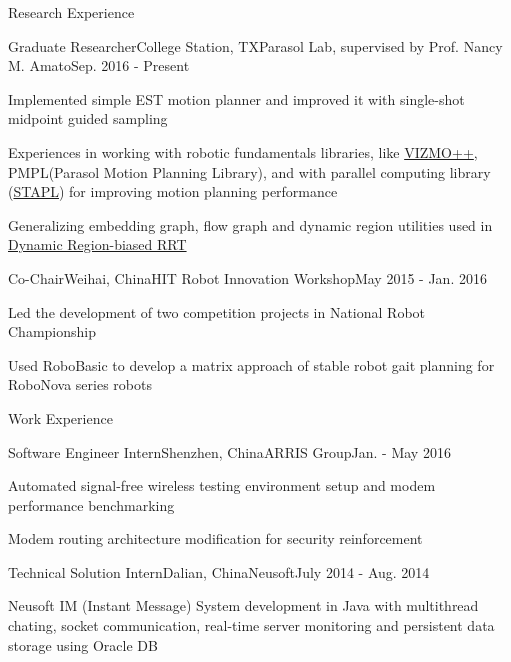 \documentclass{resume} %
\begin{document}

\begin{rSection}{Research Experience}
\begin{rSubsection}{Graduate Researcher}{College Station, TX}{Parasol Lab, supervised by Prof. Nancy M. Amato}{Sep. 2016 - Present}
\item Implemented simple EST motion planner and improved it with single-shot midpoint guided sampling
\item Experiences in working with robotic fundamentals libraries, like \href{https://parasol.tamu.edu/groups/amatogroup/research/UserGuided/Old/vizmo++/}{VIZMO++}, PMPL(Parasol Motion Planning Library), and with parallel computing library (\href{https://parasol.tamu.edu/groups/rwergergroup/research/stapl/}{STAPL}) for improving motion planning performance
\item Generalizing embedding graph, flow graph and dynamic region utilities used in \href{http://wafr2016.berkeley.edu/papers/WAFR_2016_paper_36.pdf}{Dynamic Region-biased RRT}
\end{rSubsection}

\begin{rSubsection}{Co-Chair}{Weihai, China}{HIT Robot Innovation Workshop}{May 2015 - Jan. 2016}
\item Led the development of two competition projects in National Robot Championship
\item Used RoboBasic to develop a matrix approach of stable robot gait planning for RoboNova series robots
\end{rSubsection}

\end{rSection}

\begin{rSection}{Work Experience}
\begin{rSubsection}{Software Engineer Intern}{Shenzhen, China}{ARRIS Group}{Jan. - May 2016}
\item Automated signal-free wireless testing environment setup and modem performance benchmarking
\item Modem routing architecture modification for security reinforcement
\end{rSubsection}

\begin{rSubsection}{Technical Solution Intern}{Dalian, China}{Neusoft}{July 2014 - Aug. 2014}
\item Neusoft IM (Instant Message) System development in Java with multithread chating, socket communication, real-time server monitoring and persistent data storage using Oracle DB
\end{rSubsection}
\end{rSection}
\end{document}
